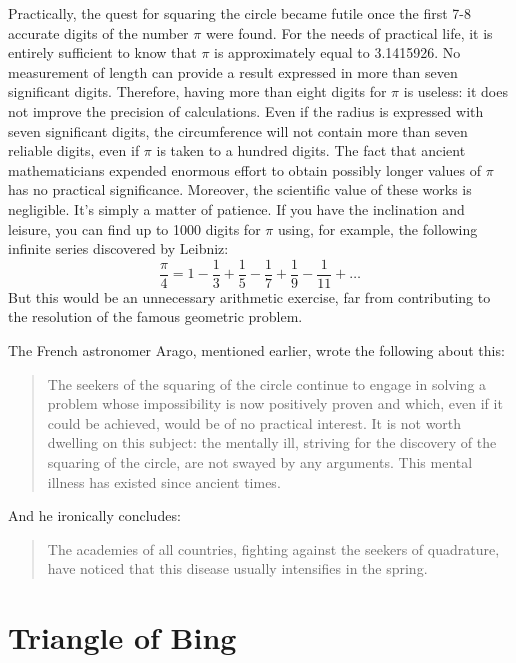 Practically, the quest for squaring the circle became futile once the first 7-8 accurate digits of the number $\pi$ were found. For the needs of practical life, it is entirely sufficient to know that $\pi$ is approximately equal to 3.1415926. No measurement of length can provide a result expressed in more than seven significant digits. Therefore, having more than eight digits for $\pi$ is useless: it does not improve the precision of calculations. Even if the radius is expressed with seven significant digits, the circumference will not contain more than seven reliable digits, even if $\pi$ is taken to a hundred digits. The fact that ancient mathematicians expended enormous effort to obtain possibly longer values of $\pi$ has no practical significance. Moreover, the scientific value of these works is negligible. It's simply a matter of patience. If you have the inclination and leisure, you can find up to 1000 digits for $\pi$ using, for example, the following infinite series discovered by Leibniz:
\begin{equation*}%
\frac{\pi}{4} = 1 - \frac{1}{3} + \frac{1}{5} - \frac{1}{7} + \frac{1}{9} - \frac{1}{11} + \ldots{}
\end{equation*}
But this would be an unnecessary arithmetic exercise, far from contributing to the resolution of the famous geometric problem.

The French astronomer Arago, mentioned earlier, wrote the following about this:
\begin{quote}
The seekers of the squaring of the circle continue to engage in solving a problem whose impossibility is now positively proven and which, even if it could be achieved, would be of no practical interest. It is not worth dwelling on this subject: the mentally ill, striving for the discovery of the squaring of the circle, are not swayed by any arguments. This mental illness has existed since ancient times.
\end{quote}
And he ironically concludes:
\begin{quote}
The academies of all countries, fighting against the seekers of quadrature, have noticed that this disease usually intensifies in the spring.
\end{quote}

\section{Triangle of Bing}
\label{sec-9.7}

